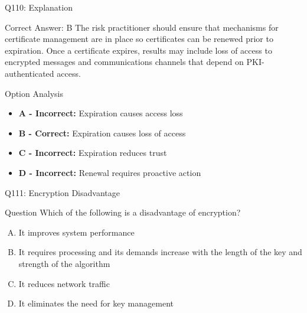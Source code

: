 \documentclass{beamer}
\begin{document}
	\begin{frame}{Q110: Explanation}
		\begin{block}{Correct Answer: B}
			The risk practitioner should ensure that mechanisms for certificate management are in place so certificates can be renewed prior to expiration. Once a certificate expires, results may include loss of access to encrypted messages and communications channels that depend on PKI-authenticated access.
		\end{block}
		\begin{block}{Option Analysis}
			\begin{itemize}
				\item \textbf{A - Incorrect:} Expiration causes access loss
				\item \textbf{B - Correct:} Expiration causes loss of access
				\item \textbf{C - Incorrect:} Expiration reduces trust
				\item \textbf{D - Incorrect:} Renewal requires proactive action
			\end{itemize}
		\end{block}
	\end{frame}
	
	\begin{frame}{Q111: Encryption Disadvantage}
		\begin{block}{Question}
			Which of the following is a disadvantage of encryption?
		\end{block}
		\begin{enumerate}[(A)]
			\item It improves system performance
			\item It requires processing and its demands increase with the length of the key and strength of the algorithm
			\item It reduces network traffic
			\item It eliminates the need for key management
		\end{enumerate}
	\end{frame}
	
\end{document}
